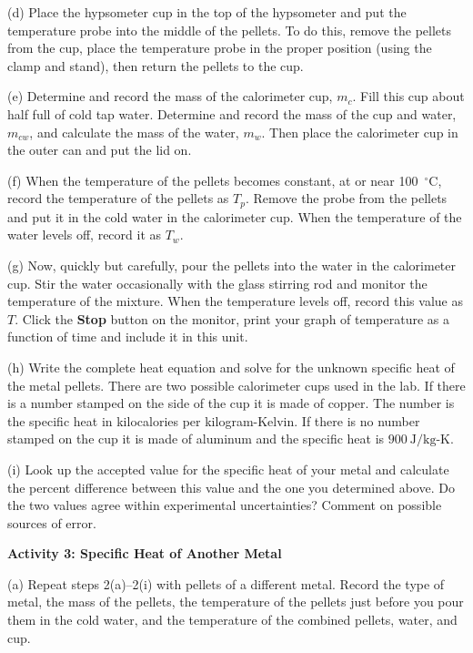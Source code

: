 (d) Place the hypsometer cup in the top of the hypsometer and put the temperature probe into the middle of the pellets.  To do this, remove the pellets from the cup, place the temperature probe in the proper position (using the clamp and stand), then return the pellets to the cup.

(e) Determine and record the mass of the calorimeter cup, $m_c$.
Fill this cup about half full of cold tap water. Determine and record
the mass of the cup and water, $m_{cw}$, and calculate the mass
of the water, $m_w$. Then place the calorimeter cup in the outer
can and put the lid on.
\vspace{15mm}

(f) When the temperature of the pellets becomes constant, at or near
100~$^{\circ }$C, record the temperature of the pellets as $T_{p}$.
Remove the probe from the pellets and put it in the cold water in the calorimeter cup. When the temperature of the water levels off, record it as $T_{w}$.
\vspace{15mm}

\pagebreak[3]
(g) Now, quickly but carefully, pour the pellets into the water in
the calorimeter cup. Stir the water occasionally with the glass stirring rod and
monitor the temperature of the mixture. When the temperature levels off, record
this value as $T$. Click the {\bf Stop} button on the monitor, print your graph of temperature as a function of time and include it in this unit.
\answerspace{20mm}

(h) Write the complete heat equation and solve for the unknown specific
heat of the metal pellets.
There are two possible calorimeter cups used in the lab.
If there is a number stamped on the side of the cup it is made of copper.
The number is the specific heat in kilocalories per kilogram-Kelvin.
If there is no number stamped on the cup it is made of aluminum and
the specific heat is $900~ \textrm{J/kg-K}$.
\answerspace{1.8in}

(i) Look up the accepted value for the specific heat of your metal and
calculate the percent difference between this value and the one you
determined above. Do the two values agree within experimental uncertainties?
Comment on possible sources of error.
\answerspace{20mm}

\textbf{Activity 3: Specific Heat of Another Metal}

(a) Repeat steps 2(a)--2(i) with pellets of a different metal.
Record the type of metal, the mass of the pellets, the temperature of the
pellets just before you pour them in the cold water, and the temperature of the
combined pellets, water, and cup.
\answerspace{15mm}

